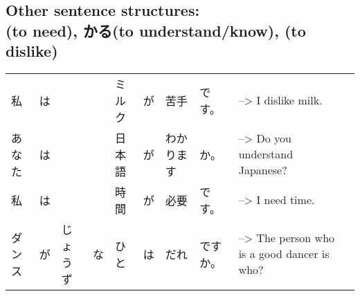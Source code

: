 \documentclass{article}
\newcommand\tab[1][1cm]{\hspace*{#1}}
\begin{document}
\subsection{Other sentence structures: \\  (to need), かる(to understand/know), (to dislike) }
\vspace{1mm}
\tab \begin{tabular}{ l l l l l l l l l l }
私&は&&&ミルク&が&苦手&です。& --> I dislike milk.\\
あなた&は&&&日本語&が&わかります&か。& --> Do you understand Japanese?\\
私&は&&&時間&が&必要&です。& --> I need time.\\
ダンス&が&じょうず&な&ひと&は&だれ&ですか。& --> The person who is a good dancer is who? %
\end{tabular}
\end{document}
